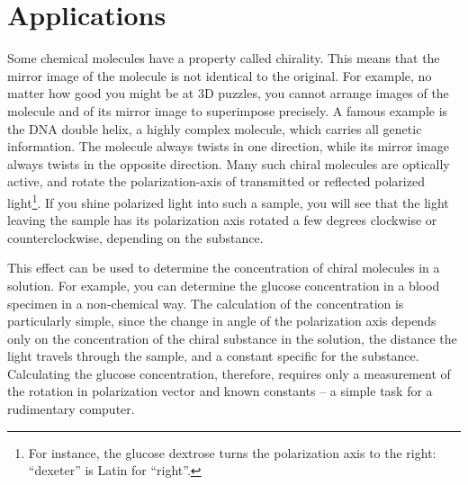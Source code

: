 \section{Applications}
Some chemical molecules have a property called chirality. This means that the mirror image of the molecule is not identical to the original. For example, no matter how good you might be at 3D puzzles, you cannot arrange images of the molecule and of its mirror image to superimpose precisely. A famous example is the DNA double helix, a highly complex molecule, which carries all genetic information. The molecule always twists in one direction, while its mirror image always twists in the opposite direction. Many such chiral molecules are optically active, and rotate the polarization-axis of transmitted or reflected polarized light\footnote{For instance, the glucose dextrose turns the polarization axis to the right: ``dexeter'' is Latin for ``right''.}. If you shine polarized light into such a sample, you will see that the light leaving the sample has its polarization axis rotated a few degrees clockwise or counterclockwise, depending on the substance.\myskip

This effect can be used to determine the concentration of chiral molecules in a solution. For example, you can determine the glucose concentration in a blood specimen in a non-chemical way. The calculation of the concentration is particularly simple, since the change in angle of the polarization axis depends only on the concentration of the chiral substance in the solution, the distance the light travels through the sample, and a constant specific for the substance. Calculating the glucose concentration, therefore, requires only a measurement of the rotation in polarization vector and known constants -- a simple task for a rudimentary computer.

\newpage
